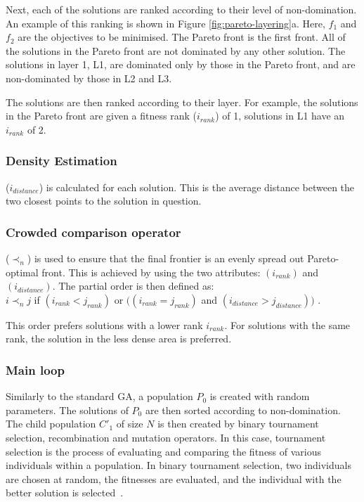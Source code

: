 Next, each of the solutions are ranked according to their level of non-domination. An example of this ranking is shown in Figure \ref{fig:pareto-layering}a. Here, $f_1$ and $f_2$ are the objectives to be minimised. The Pareto front is the first front. All of the solutions in the Pareto front are not dominated by any other solution. The solutions in layer 1, L1, are dominated only by those in the Pareto front, and are non-dominated by those in L2 and L3.

The solutions are then ranked according to their layer. For example, the solutions in the Pareto front are given a fitness rank ($i_{rank}$) of 1, solutions in L1 have an $i_{rank}$ of 2.

\subsubsection{Density Estimation}
($i_{distance}$) is calculated for each solution. This is the average distance between the two closest points to the solution in question. 


\subsubsection{Crowded comparison operator}
($\prec_n$) is used to ensure that the final frontier is an evenly spread out Pareto-optimal front. This is achieved by using the two attributes: $(i_{rank})$ and$(i_{distance})$. 
The partial order is then defined as:\\    
$i\prec_nj$ if $(i_{rank}<j_{rank})$ or $((i_{rank}=j_{rank})$ and  $(i_{distance}>j_{distance}))$ \cite{Valkanas2014}.

This order prefers solutions with a lower rank $i_{rank}$. For solutions with the same rank, the solution in the less dense area is preferred.

\subsubsection{Main loop}

Similarly to the standard GA, a population $P_{0}$ is created with random parameters. The solutions of $P_0$ are then sorted according to non-domination. The child population $C'_{1}$ of size $N$ is then created by binary tournament selection, recombination and mutation operators. In this case, tournament selection is the process of evaluating and comparing the fitness of various individuals within a population. In binary tournament selection, two individuals are chosen at random, the fitnesses are evaluated, and the individual with the better solution is selected~\cite{AbdRahman2016}. 



